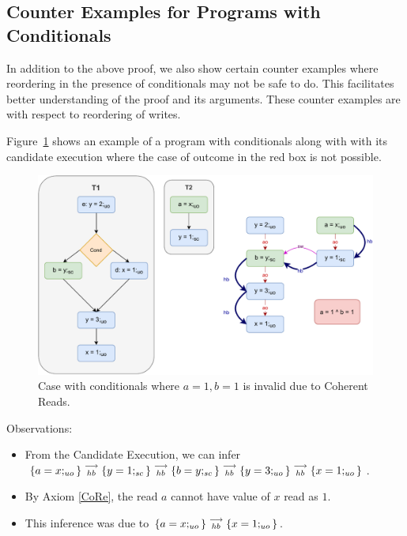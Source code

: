 \subsection{Counter Examples for Programs with Conditionals}
    
    In addition to the above proof, we also show certain counter examples where reordering in the presence of conditionals may not be safe to do. 
    This facilitates better understanding of the proof and its arguments. 
    These counter examples are with respect to reordering of writes. 
    
    Figure~\ref{reord:cond_counter_example1(a)} shows an example of a program with conditionals along with with its candidate execution where the case of outcome in the red box is not possible. 
    \begin{figure}[H]
        \centering 
        \includegraphics[scale=0.7]{5.InstructionReordering/5.ValidReorderingProgram/CounterExamples1a(Conditionals).pdf}
        \caption{Case with conditionals where $a = 1, b = 1$ is invalid due to Coherent Reads.}
        \label{reord:cond_counter_example1(a)}
    \end{figure}
    
    Observations:
    \begin{itemize}
        \item From the Candidate Execution, we can infer $\{a=x;_{uo}\}\stackrel{\longrightarrow}{_{hb}}\{y=1;_{sc}\}\stackrel{\longrightarrow}{_{hb}}\{b=y;_{sc}\}\stackrel{\longrightarrow}{_{hb}}\{y=3;_{uo}\}\stackrel{\longrightarrow}{_{hb}}\{x=1;_{uo}\}$.
        \item By Axiom \ref{CoRe}, the read $a$ cannot have value of $x$ read as $1$. 
        \item This inference was due to $\{a=x;_{uo}\}\stackrel{\longrightarrow}{_{hb}}\{x=1;_{uo}\}$.
    \end{itemize}
    
